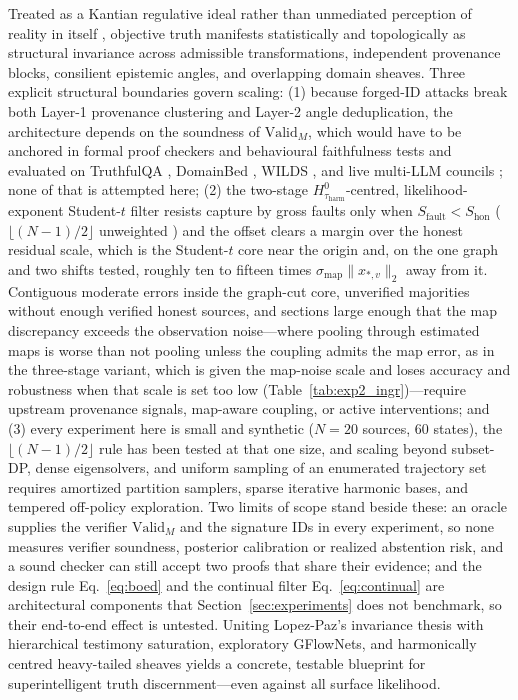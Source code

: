 \documentclass[11pt,a4paper]{article}
\theoremstyle{definition}
\theoremstyle{remark}
\newcommand{\Valid}{\mathrm{Valid}}
\begin{document}
Treated as a Kantian regulative ideal \cite{kant1781critique} rather than unmediated perception of reality in itself \cite{hoffman2019case}, objective truth manifests statistically and topologically as structural invariance across admissible transformations, independent provenance blocks, consilient epistemic angles, and overlapping domain sheaves. Three explicit structural boundaries govern scaling: (1) because forged-ID attacks break both Layer-1 provenance clustering and Layer-2 angle deduplication, the architecture depends on the soundness of $\Valid_M$, which would have to be anchored in formal proof checkers and behavioural faithfulness tests \cite{turpin2023language,lanham2023measuring} and evaluated on TruthfulQA \cite{lin2022truthfulqa}, DomainBed \cite{gulrajani2021search}, WILDS \cite{koh2021wilds}, and live multi-LLM councils \cite{perplexity2026council}; none of that is attempted here; (2) the two-stage $H^0_{\tau_{\mathrm{harm}}}$-centred, likelihood-exponent Student-$t$ filter resists capture by gross faults only when $S_{\mathrm{fault}} < S_{\mathrm{hon}}$ ($\lfloor(N-1)/2\rfloor$ unweighted \cite{lopuhaa1991breakdown}) and the offset clears a margin over the honest residual scale, which is the Student-$t$ core near the origin and, on the one graph and two shifts tested, roughly ten to fifteen times $\sigma_{\mathrm{map}}\|x_{*,v}\|_2$ away from it. Contiguous moderate errors inside the graph-cut core, unverified majorities without enough verified honest sources, and sections large enough that the map discrepancy exceeds the observation noise---where pooling through estimated maps is worse than not pooling unless the coupling admits the map error, as in the three-stage variant, which is given the map-noise scale and loses accuracy and robustness when that scale is set too low (Table~\ref{tab:exp2_ingr})---require upstream provenance signals, map-aware coupling, or active interventions; and (3) every experiment here is small and synthetic ($N = 20$ sources, $60$ states), the $\lfloor(N-1)/2\rfloor$ rule has been tested at that one size, and scaling beyond subset-DP, dense eigensolvers, and uniform sampling of an enumerated trajectory set requires amortized partition samplers, sparse iterative harmonic bases, and tempered off-policy exploration. Two limits of scope stand beside these: an oracle supplies the verifier $\Valid_M$ and the signature IDs in every experiment, so none measures verifier soundness, posterior calibration or realized abstention risk, and a sound checker can still accept two proofs that share their evidence; and the design rule Eq.~\eqref{eq:boed} and the continual filter Eq.~\eqref{eq:continual} are architectural components that Section~\ref{sec:experiments} does not benchmark, so their end-to-end effect is untested. Uniting Lopez-Paz's invariance thesis \cite{lopezpaz2026against} with hierarchical testimony saturation, exploratory GFlowNets, and harmonically centred heavy-tailed sheaves yields a concrete, testable blueprint for superintelligent truth discernment---even against all surface likelihood.
\end{document}
